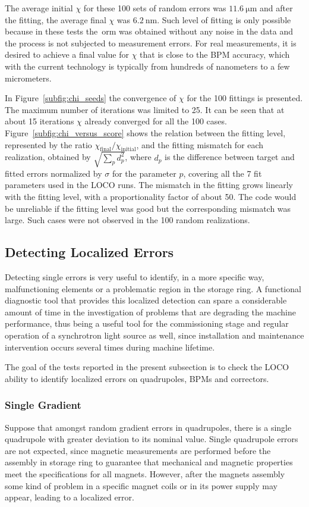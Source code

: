The average initial $\chi$ for these 100 sets of random errors was $\SI{11.6}{\micro\meter}$ and after the fitting, the average final $\chi$ was $\SI{6.2}{\nano\meter}$. Such level of fitting is only possible because in these tests the~\gls{orm} was obtained without any noise in the data and the process is not subjected to measurement errors. For real measurements, it is desired to achieve a final value for $\chi$ that is close to the BPM accuracy, which with the current technology is typically from hundreds of nanometers to a few micrometers.

In Figure~\ref{subfig:chi_seeds} the convergence of $\chi$ for the 100 fittings is presented. The maximum number of iterations was limited to 25. It can be seen that at about 15 iterations $\chi$ already converged for all the 100 cases. Figure~\ref{subfig:chi_versus_score} shows the relation between the fitting level, represented by the ratio $\chi_{\mathrm{final}}/\chi_{\mathrm{initial}}$, and the fitting mismatch for each realization, obtained by $\sqrt{\sum_{p}d_p^2}$, where $d_p$ is the difference between target and fitted errors normalized by $\sigma$ for the parameter $p$, covering all the 7 fit parameters used in the LOCO runs. The mismatch in the fitting grows linearly with the fitting level, with a proportionality factor of about 50. The code would be unreliable if the fitting level was good but the corresponding mismatch was large. Such cases were not observed in the 100 random realizations.
\subsection{Detecting Localized Errors}

Detecting single errors is very useful to identify, in a more specific way, malfunctioning elements or a problematic region in the storage ring. A functional diagnostic tool that provides this localized detection can spare a considerable amount of time in the investigation of problems that are degrading the machine performance, thus being a useful tool for the commissioning stage and regular operation of a synchrotron light source as well, since installation and maintenance intervention occurs several times during machine lifetime.

The goal of the tests reported in the present subsection is to check the LOCO ability to identify localized errors on quadrupoles, BPMs and correctors. 

\subsubsection{Single Gradient}
Suppose that amongst random gradient errors in quadrupoles, there is a single quadrupole with greater deviation to its nominal value. Single quadrupole errors are not expected, since magnetic measurements are performed before the assembly in storage ring to guarantee that mechanical and magnetic properties meet the specifications for all magnets. However, after the magnets assembly some kind of problem in a specific magnet coils or in its power supply may appear, leading to a localized error.

